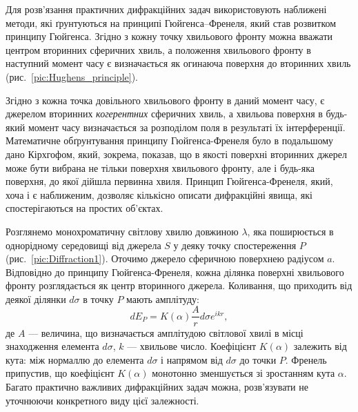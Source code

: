 Для розв’язання практичних дифракційних задач використовують наближені методи, які ґрунтуються на принципі Гюйгенса–Френеля, який став розвитком принципу Гюйгенса. Згідно з  кожну точку хвильового фронту можна вважати центром вторинних сферичних хвиль, а положення хвильового фронту в наступний момент часу є визначається як огинаюча поверхня до вторинних хвиль  (рис.~\ref{pic:Hughens_principle}).


Згідно з  кожна точка довільного хвильового фронту в даний момент часу, є джерелом вторинних \emph{когерентних} сферичних хвиль, а хвильова поверхня в будь-який момент часу визначається за розподілом поля в результаті їх інтерференції. Математичне обґрунтування принципу Гюйгенса-Френеля було в подальшому дано Кірхгофом, який, зокрема, показав, що в якості поверхні вторинних джерел може бути вибрана не тільки поверхня хвильового фронту, але і будь-яка поверхня, до якої дійшла первинна хвиля. Принцип Гюйгенса-Френеля, який, хоча і є наближеним, дозволяє кількісно описати дифракційні явища, які спостерігаються на простих об’єктах.

Розглянемо монохроматичну світлову хвилю довжиною $ \lambda $, яка поширюється в однорідному середовищі від джерела $ S $ у деяку точку спостереження $ P $ (рис.~\ref{pic:Diffraction1}). Оточимо джерело сферичною поверхнею радіусом $ a $. Відповідно до принципу Гюйгенса-Френеля, кожна ділянка поверхні хвильового фронту розглядається як центр вторинного джерела. Коливання, що приходить від деякої ділянки $ d\sigma $ в точку $ P $ мають амплітуду:
\begin{equation*}
    dE_P = K(\alpha) \frac{A}{r} d\sigma  e^{i k r},
\end{equation*}
де $ A $ --- величина, що визначається амплітудою світлової хвилі в місці знаходження елемента $ d\sigma $, $ k $ --- хвильове число. Коефіцієнт $ K(\alpha) $ залежить від кута: між нормаллю до елемента $ d\sigma $ і напрямом від $ d\sigma $ до точки $ P $. Френель припустив, що коефіцієнт $ K(\alpha) $ монотонно зменшується зі зростанням кута $ \alpha $. Багато практично важливих дифракційних задач можна,
розв'язувати не уточнюючи конкретного виду цієї залежності.

